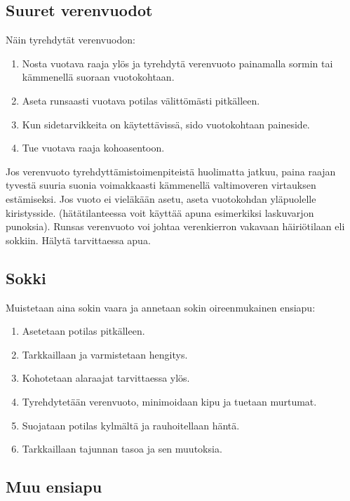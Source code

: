 \subsection{ Suuret verenvuodot }
\label{riskitekijat-toiminta-onnettomuustilanteessa-ja-ensiapu-suuret-verenvuodot}


Näin tyrehdytät verenvuodon: 

\begin{enumerate}[label=\bfseries \arabic*)]
\item  Nosta vuotava raaja ylös ja tyrehdytä verenvuoto painamalla sormin tai kämmenellä suoraan vuotokohtaan. 
\item  Aseta runsaasti vuotava potilas välittömästi pitkälleen. 
\item  Kun sidetarvikkeita on käytettävissä, sido vuotokohtaan paineside. 
\item  Tue vuotava raaja kohoasentoon. 
\end{enumerate}

Jos verenvuoto tyrehdyttämistoimenpiteistä huolimatta jatkuu, paina raajan tyvestä suuria suonia voimakkaasti kämmenellä valtimoveren virtauksen estämiseksi. Jos vuoto ei vieläkään asetu, aseta vuotokohdan yläpuolelle kiristysside. (hätätilanteessa voit käyttää apuna esimerkiksi laskuvarjon punoksia). Runsas verenvuoto voi johtaa verenkierron vakavaan häiriötilaan eli sokkiin. Hälytä tarvittaessa apua. 

\subsection{ Sokki }
\label{riskitekijat-toiminta-onnettomuustilanteessa-ja-ensiapu-sokki}


Muistetaan aina sokin vaara ja annetaan sokin oireenmukainen ensiapu: 

\begin{enumerate}[label=\bfseries \arabic*)]
\item  Asetetaan potilas pitkälleen. 
\item  Tarkkaillaan ja varmistetaan hengitys. 
\item  Kohotetaan alaraajat tarvittaessa ylös. 
\item  Tyrehdytetään verenvuoto, minimoidaan kipu ja tuetaan murtumat. 
\item  Suojataan potilas kylmältä ja rauhoitellaan häntä. 
\item  Tarkkaillaan tajunnan tasoa ja sen muutoksia. 
\end{enumerate}
\subsection{ Muu ensiapu }
\label{riskitekijat-toiminta-onnettomuustilanteessa-ja-ensiapu-muu-ensiapu}


